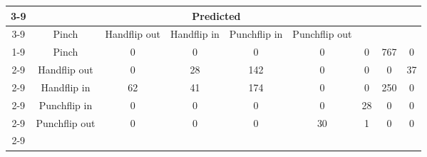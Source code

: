 \documentclass{standalone}
\begin{document}
 
 \begin{tabular}{|c |c |c |c |c |c |c |c |c |}
\cline{3-9}\multicolumn{2}{c|}{} & \multicolumn{7}{c|}{Predicted} \\ 
\cline{3-9} \multicolumn{2}{c |}{ } & Pinch & Handflip out & Handflip in & Punchflip in & Punchflip out\\ 
\cline{1-9}\multirow{7}{*}{\rotatebox[origin=c]{90}{Actual}} & Pinch & 0 & 0 & 0 & 0 & 0 & 767 & 0\\ 
 \cline{2-9} & Handflip out & 0 & 28 & 142 & 0 & 0 & 0 & 37\\ 
 \cline{2-9} & Handflip in & 62 & 41 & 174 & 0 & 0 & 250 & 0\\ 
 \cline{2-9} & Punchflip in & 0 & 0 & 0 & 0 & 28 & 0 & 0\\ 
 \cline{2-9} & Punchflip out & 0 & 0 & 0 & 30 & 1 & 0 & 0\\ 
 \cline{2-9}\hline \end{tabular}
 
\end{document}
